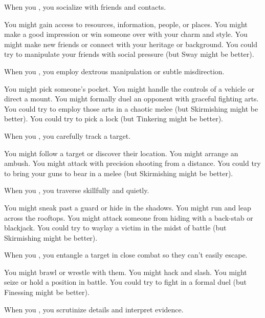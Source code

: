 When you , you socialize with friends and contacts.

\begin{qb}You might gain access to resources, information, people, or places. You might make a good impression or win someone over with your charm and style. You might make new friends or connect with your heritage or background. You could try to manipulate your friends with social pressure (but Sway might be better).\end{qb}

When you , you employ dextrous manipulation or subtle misdirection.

\begin{qb}You might pick someone’s pocket. You might handle the controls of a vehicle or direct a mount. You might formally duel an opponent with graceful fighting arts. You could try to employ those arts in a chaotic melee (but Skirmishing might be better). You could try to pick a lock (but Tinkering might be better).\end{qb}

When you , you carefully track a target.

\begin{qb}You might follow a target or discover their location. You might arrange an ambush. You might attack with precision shooting from a distance. You could try to bring your guns to bear in a melee (but Skirmishing might be better).\end{qb}

When you , you traverse skillfully and quietly.

\begin{qb}You might sneak past a guard or hide in the shadows. You might run and leap across the rooftops. You might attack someone from hiding with a back-stab or blackjack. You could try to waylay a victim in the midst of battle (but Skirmishing might be better).\end{qb}

When you , you entangle a target in close combat so they can’t easily escape.

\begin{qb}You might brawl or wrestle with them. You might hack and slash. You might seize or hold a position in battle. You could try to fight in a formal duel (but Finessing might be better).\end{qb}

When you , you scrutinize details and interpret evidence.


